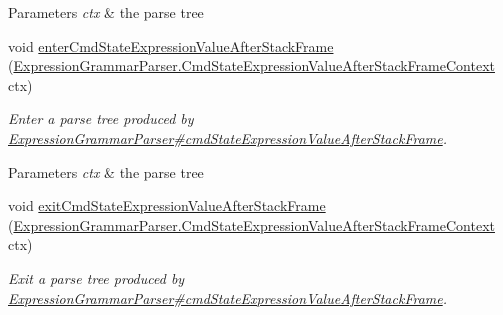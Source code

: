 \begin{DoxyCompactItemize}
\begin{DoxyCompactList}
\begin{DoxyParams}{Parameters}
{\em ctx} & the parse tree\\
\hline
\end{DoxyParams}
 \end{DoxyCompactList}\item 
void \hyperlink{classgov_1_1nasa_1_1jpf_1_1inspector_1_1server_1_1expression_1_1parser_1_1_expression_grammar_base_listener_aa431b02b52924b75a9e3d64dd92ebd64}{enter\+Cmd\+State\+Expression\+Value\+After\+Stack\+Frame} (\hyperlink{classgov_1_1nasa_1_1jpf_1_1inspector_1_1server_1_1expression_1_1parser_1_1_expression_grammar_pa89116a9ed8dad2a185081bb1175595f7}{Expression\+Grammar\+Parser.\+Cmd\+State\+Expression\+Value\+After\+Stack\+Frame\+Context} ctx)
\begin{DoxyCompactList}\small\item\em Enter a parse tree produced by \hyperlink{classgov_1_1nasa_1_1jpf_1_1inspector_1_1server_1_1expression_1_1parser_1_1_expression_grammar_parser_a3c4b19fe3874c3c607c97ca475d31322}{Expression\+Grammar\+Parser\#cmd\+State\+Expression\+Value\+After\+Stack\+Frame}.


\begin{DoxyParams}{Parameters}
{\em ctx} & the parse tree\\
\hline
\end{DoxyParams}
 \end{DoxyCompactList}\item 
void \hyperlink{classgov_1_1nasa_1_1jpf_1_1inspector_1_1server_1_1expression_1_1parser_1_1_expression_grammar_base_listener_aba6f62359b5f56b81c9de64373250a84}{exit\+Cmd\+State\+Expression\+Value\+After\+Stack\+Frame} (\hyperlink{classgov_1_1nasa_1_1jpf_1_1inspector_1_1server_1_1expression_1_1parser_1_1_expression_grammar_pa89116a9ed8dad2a185081bb1175595f7}{Expression\+Grammar\+Parser.\+Cmd\+State\+Expression\+Value\+After\+Stack\+Frame\+Context} ctx)
\begin{DoxyCompactList}\small\item\em Exit a parse tree produced by \hyperlink{classgov_1_1nasa_1_1jpf_1_1inspector_1_1server_1_1expression_1_1parser_1_1_expression_grammar_parser_a3c4b19fe3874c3c607c97ca475d31322}{Expression\+Grammar\+Parser\#cmd\+State\+Expression\+Value\+After\+Stack\+Frame}.



\end{DoxyCompactList}
\end{DoxyCompactItemize}
